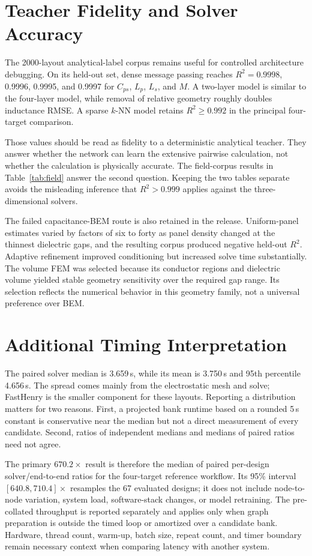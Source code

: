 \documentclass[letterpaper,twocolumn,9pt]{extarticle}
\newcommand{\Cps}{C_{ps}}
\newcommand{\Lp}{L_p}
\newcommand{\Ls}{L_s}
\newcommand{\Mut}{M}
\begin{document}
\section{Teacher Fidelity and Solver Accuracy}
The 2000-layout analytical-label corpus remains useful for controlled architecture debugging. On its held-out set, dense message passing reaches $R^2=0.9998$, 0.9996, 0.9995, and 0.9997 for $\Cps$, $\Lp$, $\Ls$, and $\Mut$. A two-layer model is similar to the four-layer model, while removal of relative geometry roughly doubles inductance RMSE. A sparse $k$-NN model retains $R^2\ge0.992$ in the principal four-target comparison.

Those values should be read as fidelity to a deterministic analytical teacher. They answer whether the network can learn the extensive pairwise calculation, not whether the calculation is physically accurate. The field-corpus results in Table~\ref{tab:field} answer the second question. Keeping the two tables separate avoids the misleading inference that $R^2>0.999$ applies against the three-dimensional solvers.

The failed capacitance-BEM route is also retained in the release. Uniform-panel estimates varied by factors of six to forty as panel density changed at the thinnest dielectric gaps, and the resulting corpus produced negative held-out $R^2$. Adaptive refinement improved conditioning but increased solve time substantially. The volume FEM was selected because its conductor regions and dielectric volume yielded stable geometry sensitivity over the required gap range. Its selection reflects the numerical behavior in this geometry family, not a universal preference over BEM.

\section{Additional Timing Interpretation}
The paired solver median is 3.659\,s, while its mean is 3.750\,s and 95th percentile 4.656\,s. The spread comes mainly from the electrostatic mesh and solve; FastHenry is the smaller component for these layouts. Reporting a distribution matters for two reasons. First, a projected bank runtime based on a rounded 5\,s constant is conservative near the median but not a direct measurement of every candidate. Second, ratios of independent medians and medians of paired ratios need not agree.

The primary $670.2\times$ result is therefore the median of paired per-design solver/end-to-end ratios for the four-target reference workflow. Its 95\% interval $[640.8,710.4]\times$ resamples the 67 evaluated designs; it does not include node-to-node variation, system load, software-stack changes, or model retraining. The pre-collated throughput is reported separately and applies only when graph preparation is outside the timed loop or amortized over a candidate bank. Hardware, thread count, warm-up, batch size, repeat count, and timer boundary remain necessary context when comparing latency with another system.

{\fontsize{8}{9.5}\selectfont


}
\end{document}
